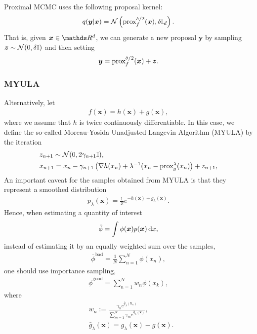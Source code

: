 \documentclass[10pt]{article}
\numberwithin{equation}{section}
\begin{document}
Proximal MCMC uses the following proposal kernel:
\begin{align*}
q(\bm y | \bm x) =  \mathcal{N}\left( \text{prox}_{f}^{\delta/2}(\bm x), \delta \mathbb{I}_d \right).
\end{align*}
That is, given $\bm x \in \R^d$, we can generate a new proposal $\bm y$ by sampling $\bm z \sim \mathcal{N}(0, \delta \mathbb{I})$ and then setting
\begin{align*}
\bm y = \text{prox}_{f}^{\delta / 2}(\bm x) + \bm z.
\end{align*}

\subsubsection{MYULA}

Alternatively, let
\begin{align*}
f(\bm x) = h(\bm x) + g(\bm x),
\end{align*}
where we assume that $h$ is twice continuously differentiable. In this case, we define the so-called Moreau-Yosida Unadjusted Langevin Algorithm (MYULA) by the iteration
\begin{align*}
& z_{n+1} \sim \mathcal{N}(0, 2 \gamma_{n+1} \mathbb{I}), \\
& x_{n+1} = x_n - \gamma_{n+1} \left(\nabla h(x_n) + \lambda^{-1}(x_n - \text{prox}_{g}^{\lambda}(x_n) \right) + z_{n+1}, \\
\end{align*}
An important caveat for the samples obtained from MYULA is that they represent a smoothed distribution
\begin{align*}
p_\lambda(\bm x) = \frac{1}{Z} e^{-h(\bm x) + g_\lambda(\bm x)}.
\end{align*}
Hence, when estimating a quantity of interest
\begin{align*}
\bar \phi = \int \phi(\bm x) p(\bm x) \,\mathrm d x,
\end{align*}
instead of estimating it by an equally weighted sum over the samples,
\begin{align*}
\bar \phi^\text{bad} = \frac{1}{N} \sum_{n=1}^N \phi(x_n),
\end{align*}
one should use importance sampling,
\begin{align*}
\bar \phi^\text{good} = \sum_{n=1}^N w_n \phi(x_k),
\end{align*}
where
\begin{align*}
& w_n := \frac{\gamma_n e^{\bar g_\lambda(\bm x_n)}}{\sum_{m=1}^N \gamma_m e^{\bar g_\lambda(\bm x)}}, \\
& \bar g_\lambda(\bm x) = g_\lambda(\bm x) - g(\bm x).
\end{align*}
\end{document}
